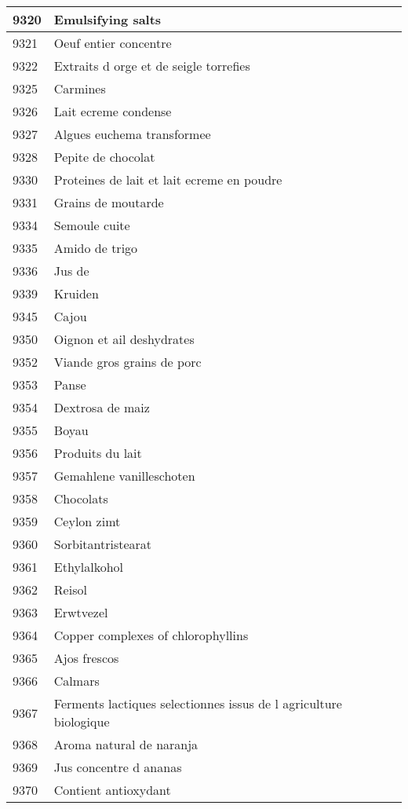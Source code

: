 \begin{longtable}{|l|l|}
9320 & Emulsifying salts \\ \hline 
9321 & Oeuf entier concentre \\ \hline 
9322 & Extraits d orge et de seigle torrefies \\ \hline 
9325 & Carmines \\ \hline 
9326 & Lait ecreme condense \\ \hline 
9327 & Algues euchema transformee \\ \hline 
9328 & Pepite de chocolat \\ \hline 
9330 & Proteines de lait et lait ecreme en poudre \\ \hline 
9331 & Grains de moutarde \\ \hline 
9334 & Semoule cuite \\ \hline 
9335 & Amido de trigo \\ \hline 
9336 & Jus de \\ \hline 
9339 & Kruiden \\ \hline 
9345 & Cajou \\ \hline 
9350 & Oignon et ail deshydrates \\ \hline 
9352 & Viande gros grains de porc \\ \hline 
9353 & Panse \\ \hline 
9354 & Dextrosa de maiz \\ \hline 
9355 & Boyau \\ \hline 
9356 & Produits du lait \\ \hline 
9357 & Gemahlene vanilleschoten \\ \hline 
9358 & Chocolats \\ \hline 
9359 & Ceylon zimt \\ \hline 
9360 & Sorbitantristearat \\ \hline 
9361 & Ethylalkohol \\ \hline 
9362 & Reisol \\ \hline 
9363 & Erwtvezel \\ \hline 
9364 & Copper complexes of chlorophyllins \\ \hline 
9365 & Ajos frescos \\ \hline 
9366 & Calmars \\ \hline 
9367 & Ferments lactiques selectionnes issus de l agriculture biologique \\ \hline 
9368 & Aroma natural de naranja \\ \hline 
9369 & Jus concentre d ananas \\ \hline 
9370 & Contient antioxydant \\ \hline 

\end{longtable}
